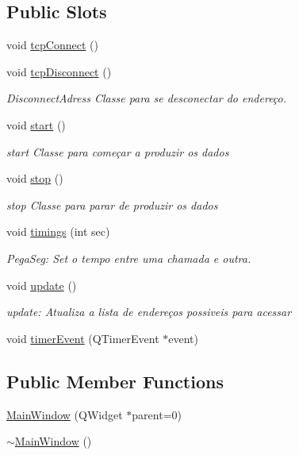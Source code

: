 \subsection*{Public Slots}
\begin{DoxyCompactItemize}
\item 
void \mbox{\hyperlink{class_main_window_ac5b669957c442b6eb68573dacfce33e1}{tcp\+Connect}} ()
\item 
void \mbox{\hyperlink{class_main_window_a4d22c4c7afc7ba0a2fa4c70515c85dda}{tcp\+Disconnect}} ()
\begin{DoxyCompactList}\small\item\em Disconnect\+Adress Classe para se desconectar do endereço. \end{DoxyCompactList}\item 
void \mbox{\hyperlink{class_main_window_a5edcbc314e782645cdf4db101eeb247d}{start}} ()
\begin{DoxyCompactList}\small\item\em start Classe para começar a produzir os dados \end{DoxyCompactList}\item 
void \mbox{\hyperlink{class_main_window_a939e90ddfe07d74be87b351ca2171fb0}{stop}} ()
\begin{DoxyCompactList}\small\item\em stop Classe para parar de produzir os dados \end{DoxyCompactList}\item 
void \mbox{\hyperlink{class_main_window_ad4393fd0668b17a585c39d8824d9a275}{timings}} (int sec)
\begin{DoxyCompactList}\small\item\em Pega\+Seg\+: Set o tempo entre uma chamada e outra. \end{DoxyCompactList}\item 
void \mbox{\hyperlink{class_main_window_a128f71880d4b9683149023fc46fcc9f8}{update}} ()
\begin{DoxyCompactList}\small\item\em update\+: Atualiza a lista de endereços possiveis para acessar \end{DoxyCompactList}\item 
void \mbox{\hyperlink{class_main_window_aaa425b1554af3c1f58cc70b4815082ae}{timer\+Event}} (Q\+Timer\+Event $\ast$event)
\end{DoxyCompactItemize}
\subsection*{Public Member Functions}
\begin{DoxyCompactItemize}
\item 
\mbox{\hyperlink{class_main_window_a8b244be8b7b7db1b08de2a2acb9409db}{Main\+Window}} (Q\+Widget $\ast$parent=0)
\item 
\mbox{\hyperlink{class_main_window_ae98d00a93bc118200eeef9f9bba1dba7}{$\sim$\+Main\+Window}} ()
\end{DoxyCompactItemize}


